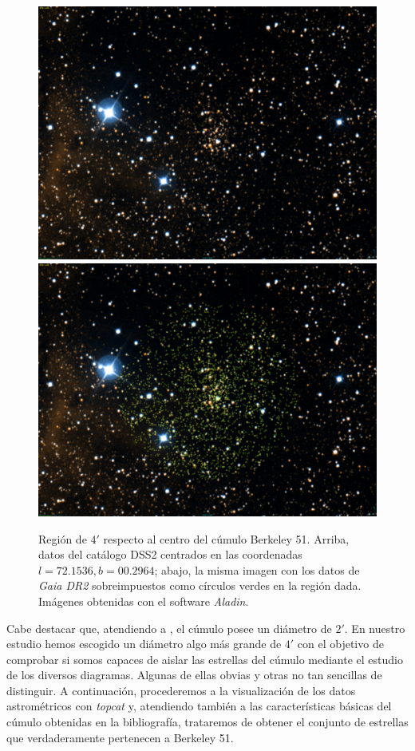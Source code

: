 \documentclass[a4paper,fleqn,usenatbib]{mnras}
\begin{document}
\begin{figure}
  \centering
  \includegraphics[width=\linewidth]{img/cumulo_berkeley}
  \includegraphics[width=\linewidth]{img/cumulo_berkeley_gaia}
  \caption{Región de $4'$ respecto al centro del cúmulo Berkeley 51. Arriba, datos del catálogo \ac{DSS2} centrados en las coordenadas $l=72.1536, b=00.2964$; abajo, la misma imagen con los datos de \emph{Gaia DR2} sobreimpuestos como círculos verdes en la región dada. Imágenes obtenidas con el software \emph{Aladin}.}
  \label{fig:e2_b51}
\end{figure}

Cabe destacar que, atendiendo a \cite{Tadross2008}, el cúmulo posee un diámetro de $2'$. En nuestro estudio hemos escogido un diámetro algo más grande de $4'$ con el objetivo de comprobar si somos capaces de aislar las estrellas del cúmulo mediante el estudio de los diversos diagramas. Algunas de ellas obvias y otras no tan sencillas de distinguir. A continuación, procederemos a la visualización de los datos astrométricos con \emph{topcat} y, atendiendo también a las características básicas del cúmulo obtenidas en la bibliografía, trataremos de obtener el conjunto de estrellas que verdaderamente pertenecen a Berkeley 51.
\end{document}
